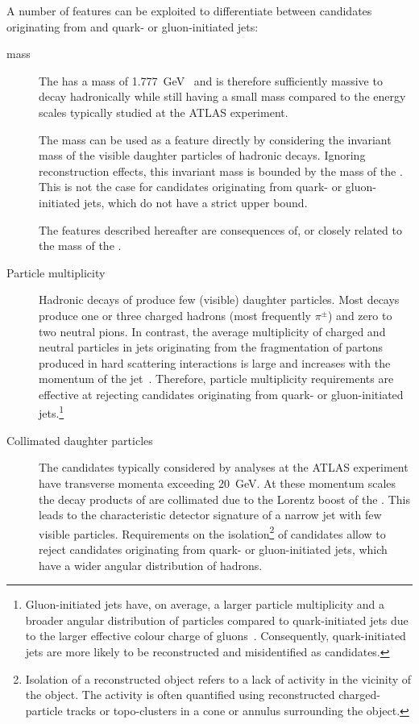 A number of features can be exploited to differentiate between
\tauhadvis candidates originating from \tauhad and quark- or
gluon-initiated jets:
\begin{description}

\item[\taulepton mass] The \taulepton has a mass of
  \SI{1.777}{\GeV}~\cite{pdg2020} and is therefore sufficiently massive to decay
  hadronically while still having a small mass compared to the energy scales
  typically studied at the ATLAS experiment.

  The \taulepton mass can be used as a feature directly by considering the
  invariant mass of the visible daughter particles of hadronic \taulepton
  decays. Ignoring reconstruction effects, this invariant mass is bounded by the
  mass of the \taulepton. This is not the case for \tauhadvis candidates
  originating from quark- or gluon-initiated jets, which do not have a strict
  upper bound.

  The features described hereafter are consequences of, or closely
  related to the mass of the \taulepton.

\item[Particle multiplicity] Hadronic decays of \tauleptons produce
  few (visible) daughter particles. Most decays produce one or three
  charged hadrons (most frequently $\pi^{\pm}$) and zero to two
  neutral pions.
  In contrast, the average multiplicity of charged and neutral particles in jets
  originating from the fragmentation of partons produced in hard scattering
  interactions is large and increases with the momentum of the
  jet~\cite{Ellis:1996mzs,STDM-2015-12}. Therefore, particle multiplicity
  requirements are effective at rejecting \tauhadvis candidates originating from
  quark- or gluon-initiated jets.\footnote{Gluon-initiated jets have, on
    average, a larger particle multiplicity and a broader angular distribution
    of particles compared to quark-initiated jets due to the larger effective
    colour charge of gluons~\cite{Ellis:1996mzs}. Consequently, quark-initiated
    jets are more likely to be reconstructed and misidentified as \tauhadvis
    candidates.}

\item[Collimated daughter particles] The \tauhadvis candidates typically
  considered by analyses at the ATLAS experiment have transverse momenta
  exceeding \SI{20}{\GeV}. At these momentum scales the decay products of
  \tauleptons are collimated due to the Lorentz boost of the \taulepton. This
  leads to the characteristic detector signature of a narrow jet with few
  visible particles. Requirements on the isolation\footnote{Isolation of a
    reconstructed object refers to a lack of activity in the vicinity of the
    object. The activity is often quantified using reconstructed
    charged-particle tracks or topo-clusters in a cone or annulus surrounding
    the object.} of \tauhadvis candidates allow to reject candidates originating
  from quark- or gluon-initiated jets, which have a wider angular distribution
  of hadrons.


\end{description}
